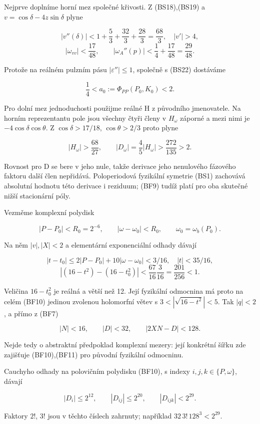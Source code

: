 \documentclass[11pt,a4paper]{article}
\theoremstyle{remark}\newtheorem{remark}[theorem]{Poznámka}
\numberwithin{equation}{section}
\begin{document}
Nejprve doplníme horní mez společné křivosti. Z (BS18),(BS19) a
\(v=\cos\delta-4z\sin\delta\) plyne

\[
|v''(\delta)|<1+\frac53+\frac{32}3+\frac{28}3=\frac{68}3,
\quad |v'|>4,
\] \[
|\omega_{vv}|<\frac{17}{48},\qquad
|\omega_A''(p)|<\frac14+\frac{17}{48}=\frac{29}{48}.
\]

Protože na reálném pulzním pásu \(|\varepsilon''|\le1\), společně s
(BS22) dostáváme

\[
\boxed{\frac14<a_0:=\Phi_{PP}(P_0,K_0)<2.}
\tag{BF8}
\]

Pro dolní mez jednoduchosti použijme reálné H z původního jmenovatele.
Na horním reprezentantu pole jsou všechny čtyři členy v \(H_\omega\)
záporné a mezi nimi je \(-4\cos\delta\cos\theta\). Z
\(\cos\delta>17/18\), \(\cos\theta>2/3\) proto plyne

\[
|H_\omega|>\frac{68}{27},\qquad
|D_\omega|=\frac45|H_\omega|>\frac{272}{135}>2.
\tag{BF9}
\]

Rovnost pro D se bere v jeho nule, takže derivace jeho nenulového
fázového faktoru další člen nepřidává. Poloperiodová fyzikální symetrie
(BS1) zachovává absolutní hodnotu této derivace i reziduum; (BF9) tudíž
platí pro oba skutečné nižší stacionární póly.

Vezměme komplexní polydisk

\[
|P-P_0|<R_0=2^{-6},\qquad |\omega-\omega_0|<R_0,
\qquad \omega_0=\omega_b(P_0).
\tag{BF10}
\]

Na něm \(|v|,|X|<2\) a elementární exponenciální odhady dávají

\[
|t-t_0|\le2|P-P_0|+10|\omega-\omega_0|<3/16,
\quad |t|<35/16,
\] \[
|(16-t^2)-(16-t_0^2)|<\frac{67}{16}\frac3{16}
=\frac{201}{256}<1.
\tag{BF11}
\]

Veličina \(16-t_0^2\) je reálná a větší než 12. Její fyzikální odmocnina
má proto na celém (BF10) jedinou zvolenou holomorfní větev s
\(3<|\sqrt{16-t^2}|<5\). Tak \(|q|<2\), a přímo z (BF7)

\[
|N|<16,\qquad |D|<32,\qquad |2XN-D|<128.
\tag{BF12}
\]

Nejde tedy o abstraktní předpoklad komplexní mezery: její konkrétní
šířku zde zajišťuje (BF10),(BF11) pro původní fyzikální odmocninu.

Cauchyho odhady na polovičním polydisku (BF10), s indexy
\(i,j,k\in\{P,\omega\}\), dávají

\[
|D_i|\le2^{12},\qquad |D_{ij}|\le2^{20},\qquad
|D_{ijk}|<2^{29}.
\tag{BF13}
\]

Faktory \(2!\), \(3!\) jsou v těchto číslech zahrnuty; například
\(32\,3!\,128^3<2^{29}\).
\end{document}
